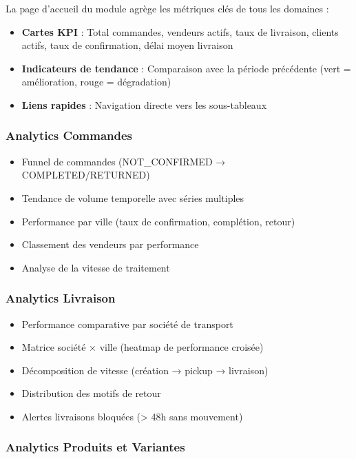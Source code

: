 \documentclass[12pt,a4paper,openany]{report}
\begin{document}
La page d'accueil du module agrège les métriques clés de tous les domaines :

\begin{itemize}
  \item \textbf{Cartes KPI} : Total commandes, vendeurs actifs, taux de livraison, clients actifs, taux de confirmation, délai moyen livraison
  \item \textbf{Indicateurs de tendance} : Comparaison avec la période précédente (vert = amélioration, rouge = dégradation)
  \item \textbf{Liens rapides} : Navigation directe vers les sous-tableaux
\end{itemize}

\subsubsection{Analytics Commandes}

\begin{itemize}
  \item Funnel de commandes (NOT\_CONFIRMED → COMPLETED/RETURNED)
  \item Tendance de volume temporelle avec séries multiples
  \item Performance par ville (taux de confirmation, complétion, retour)
  \item Classement des vendeurs par performance
  \item Analyse de la vitesse de traitement
\end{itemize}

\subsubsection{Analytics Livraison}

\begin{itemize}
  \item Performance comparative par société de transport
  \item Matrice société × ville (heatmap de performance croisée)
  \item Décomposition de vitesse (création → pickup → livraison)
  \item Distribution des motifs de retour
  \item Alertes livraisons bloquées (> 48h sans mouvement)
\end{itemize}

\subsubsection{Analytics Produits et Variantes}
\end{document}
